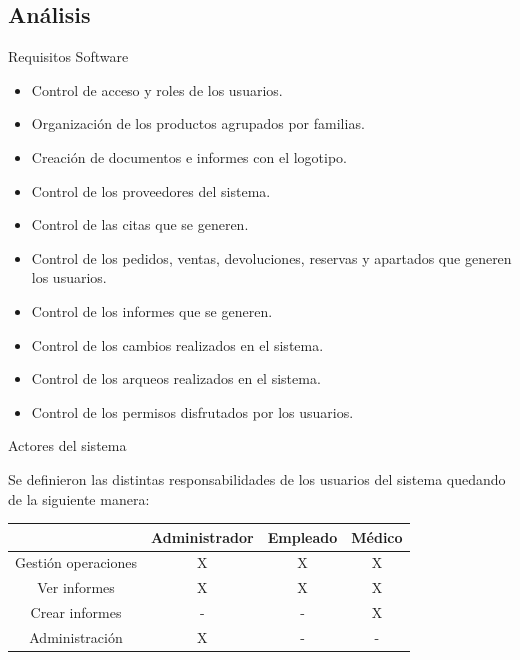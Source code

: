 \documentclass[spanish,xcolor=table,svgnames]{beamer}
\begin{document}
\subsection*{Análisis}
\begin{frame}{Requisitos Software}
  \begin{block}{}
\begin{itemize}
\item Control de acceso y roles de los usuarios.\pause
\item Organización de los productos agrupados por familias.\pause
\item Creación de documentos e informes con el logotipo.\pause
\item Control de los proveedores del sistema.\pause
\item Control de las citas que se generen.\pause
\item Control de los pedidos, ventas, devoluciones, reservas y apartados que generen los usuarios.\pause
\item Control de los informes que se generen.\pause
\item Control de los cambios realizados en el sistema.\pause
\item Control de los arqueos realizados en el sistema.\pause
\item Control de los permisos disfrutados por los usuarios.
\end{itemize}
  \end{block}
\end{frame}

\begin{frame}{Actores del sistema}

Se definieron las distintas responsabilidades de los usuarios del sistema quedando de la siguiente manera:\\
\begin{table}[ht]
\begin{tabular}{c c c c} %
\hline\hline                        %
 & Administrador & Empleado & Médico\\ [0.5ex] %
\hline                  %
Gestión operaciones & X & X & X  \\ %
Ver informes & X & X & X \\
Crear informes & - & - & X  \\
Administración & X & - & -  \\   [1ex]      %
\hline
\end{tabular}
\end{table}
\end{frame}
\end{document}
